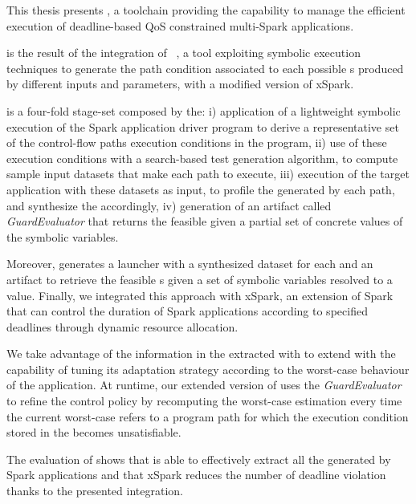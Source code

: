This thesis presents \tool, a toolchain providing the capability to manage the efficient execution of deadline-based QoS constrained multi-\plan Spark applications. 

\tool is the result of the integration of \dSymb~\cite{Baresi-Quattrocchi-Denaro:2019}, a tool exploiting symbolic execution techniques to generate the path condition associated to each possible {\plan}s produced by different inputs and parameters, with a modified version of xSpark.

\dSymb is a four-fold stage-set composed by the: i) application of a lightweight symbolic execution of the Spark application driver program to derive a representative set of the control-flow paths execution conditions in the program, ii) use of these execution conditions with a search-based test generation algorithm, to compute sample input datasets that make each path to execute, iii) execution of the target application with these datasets as input, to profile the \plan generated by each path, and synthesize the \model accordingly, iv) generation of an artifact called \textit{GuardEvaluator} that returns the feasible \plans given a partial set of concrete values of the symbolic variables. 

Moreover, \tool generates a launcher with a synthesized dataset for each \plan and an artifact to retrieve the feasible {\plan}s given a set of symbolic variables  resolved to a value. Finally, we integrated this approach with xSpark, an extension of Spark that can control the duration of Spark applications according to specified deadlines through dynamic resource allocation. 

We take advantage of the information in the \model extracted with \approach to extend \cSpark %
with the capability of tuning its adaptation strategy according to the worst-case behaviour of the application. At runtime, our extended version of \cSpark uses the \textit{GuardEvaluator} to refine the control policy by recomputing the worst-case estimation every time the current worst-case refers to a program path for which the execution condition stored in the \model becomes unsatisfiable.

The evaluation of shows that \approach is able to effectively extract all the \plans generated by Spark applications and that xSpark reduces the number of deadline violation thanks to the presented integration.


